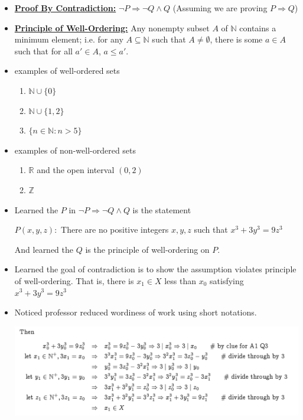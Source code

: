 \documentclass[12pt]{article}
\begin{document}
\begin{itemize}
    \item \underline{\textbf{Proof By Contradiction:}} $\neg P \Rightarrow \neg Q \land Q$ (Assuming
    we are proving $P \Rightarrow Q$)
    \item \underline{\textbf{Principle of Well-Ordering:}} Any nonempty subset $A$
    of $\mathbb{N}$ contains a minimum element; i.e. for any $A \subseteq \mathbb{N}$
    such that $A \neq \emptyset$, there is some $a \in A$ such that for all $a' \in A$, $a \leq a'$.

    \item examples of well-ordered sets
    \begin{enumerate}[1.]
        \item $\mathbb{N} \cup \{0\}$
        \item $\mathbb{N} \cup \{1,2\}$
        \item $\{n \in \mathbb{N}: n > 5\}$
    \end{enumerate}
    \item examples of non-well-ordered sets
    \begin{enumerate}[1.]
        \item $\mathbb{R}$ and the open interval $(0,2)$
        \item $\mathbb{Z}$
    \end{enumerate}

    \item Learned the $P$ in $\neg P \Rightarrow \neg Q \land Q$ is the statement

    \bigskip

    \begin{center}
        $P(x,y,z):$ There are no positive integers $x,y,z$ such that $x^3 + 3y^3 = 9z^3$
    \end{center}

    \bigskip

    And learned the $Q$ is the principle of well-ordering on $P$.

    \item Learned the goal of contradiction is to show the assumption violates principle
    of well-ordering. That is, there is $x_1 \in X$ less than $x_0$ satisfying
    $x^3 + 3y^3 = 9z^3$

    \item Noticed professor reduced wordiness of work using short notations.

    \begin{center}
    \includegraphics[width=0.8\linewidth]{images/worksheet_3_q1_note.png}
    \end{center}

\end{itemize}
\end{document}
